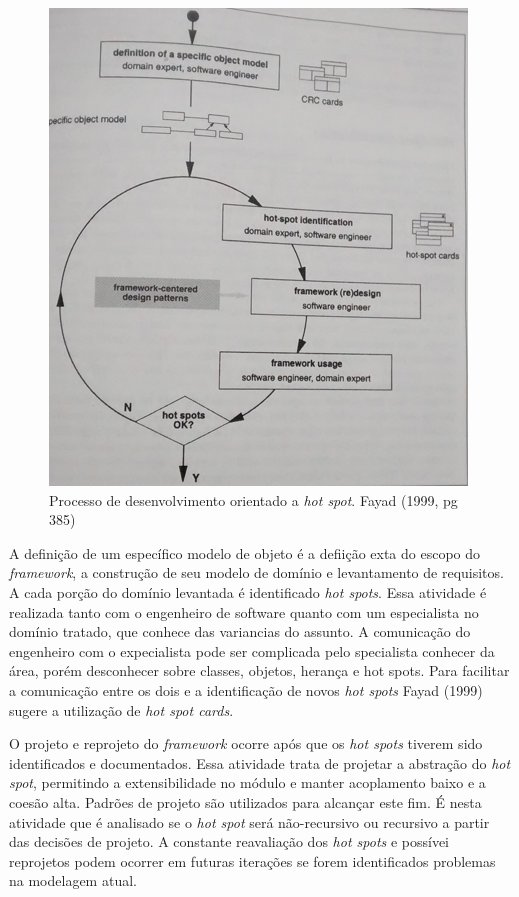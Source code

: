 \begin{figure}[h]
	\centering
	\label{fig14}
		\includegraphics[keepaspectratio=true,scale=0.4]{figuras/hotspotdd.jpg}
	\caption{Processo de desenvolvimento orientado a \textit{hot spot}. Fayad (1999, pg 385)}
\end{figure}

A definição de um específico modelo de objeto é a defiição exta do escopo do \textit{framework}, a construção de seu modelo de domínio e levantamento de requisitos. A cada porção do domínio levantada é identificado \textit{hot spots}. Essa atividade é realizada tanto com o engenheiro de software quanto com um especialista no domínio tratado, que conhece das variancias do assunto. A comunicação do engenheiro com o expecialista pode ser complicada pelo specialista conhecer da área, porém desconhecer sobre classes, objetos, herança e hot spots. Para facilitar a comunicação entre os dois e a identificação de novos \textit{hot spots} Fayad (1999) sugere a utilização de \textit{hot spot cards}.

O projeto e reprojeto do \textit{framework} ocorre após que os \textit{hot spots} tiverem sido identificados e documentados. Essa atividade trata de projetar a abstração do \textit{hot spot}, permitindo a extensibilidade no módulo e manter acoplamento baixo e a coesão alta. Padrões de projeto são utilizados para alcançar este fim. É nesta atividade que é analisado se o \textit{hot spot} será não-recursivo ou recursivo a partir das decisões de projeto. A constante reavaliação dos \textit{hot spots} e possívei reprojetos podem ocorrer em futuras iterações se forem identificados problemas na modelagem atual.

